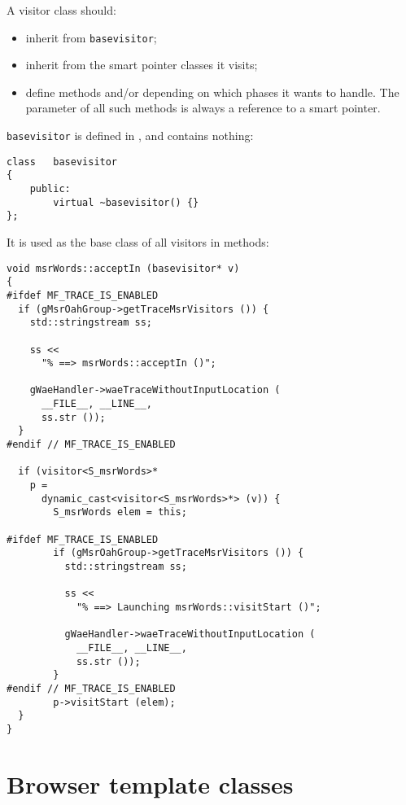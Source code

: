 A visitor class   should:
\begin{itemize}
\item inherit from {\tt basevisitor};
\item inherit from the smart pointer classes it visits;
\item define methods  and/or  depending on which phases it wants to handle. The parameter of all such  methods is always a reference to a smart pointer.
\end{itemize}

{\tt basevisitor} is defined in , and contains nothing:
\begin{lstlisting}[language=CPlusPlus]
class   basevisitor
{
	public:
		virtual ~basevisitor() {}
};
\end{lstlisting}

It is used as the base class   of all visitors in  methods:
\begin{lstlisting}[language=CPlusPlus]
void msrWords::acceptIn (basevisitor* v)
{
#ifdef MF_TRACE_IS_ENABLED
  if (gMsrOahGroup->getTraceMsrVisitors ()) {
    std::stringstream ss;

    ss <<
      "% ==> msrWords::acceptIn ()";

    gWaeHandler->waeTraceWithoutInputLocation (
      __FILE__, __LINE__,
      ss.str ());
  }
#endif // MF_TRACE_IS_ENABLED

  if (visitor<S_msrWords>*
    p =
      dynamic_cast<visitor<S_msrWords>*> (v)) {
        S_msrWords elem = this;

#ifdef MF_TRACE_IS_ENABLED
        if (gMsrOahGroup->getTraceMsrVisitors ()) {
          std::stringstream ss;

          ss <<
            "% ==> Launching msrWords::visitStart ()";

          gWaeHandler->waeTraceWithoutInputLocation (
            __FILE__, __LINE__,
            ss.str ());
        }
#endif // MF_TRACE_IS_ENABLED
        p->visitStart (elem);
  }
}
\end{lstlisting}


\section{Browser template classes}

